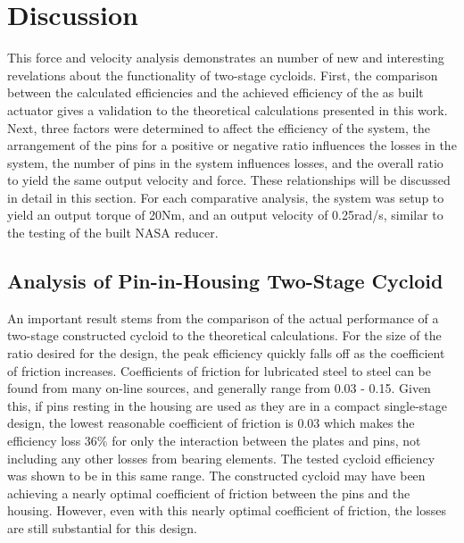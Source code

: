 \section{Discussion} \label{ch:dual:discussion}

This force and velocity analysis demonstrates an number of new and interesting revelations about the functionality of two-stage cycloids. First, the comparison between the calculated efficiencies and the achieved efficiency of the as built actuator gives a validation to the theoretical calculations presented in this work. Next, three factors were determined to affect the efficiency of the system, the arrangement of the pins for a positive or negative ratio influences the losses in the system, the number of pins in the system influences losses, and the overall ratio to yield the same output velocity and force. These relationships will be discussed in detail in this section. For each comparative analysis, the system was setup to yield an output torque of 20Nm, and an output velocity of 0.25rad/s, similar to the testing of the built NASA reducer.

\subsection{Analysis of Pin-in-Housing Two-Stage Cycloid} \label{ch:dual:discussion:actual}

An important result stems from the comparison of the actual performance of a two-stage constructed cycloid to the theoretical calculations. For the size of the ratio desired for the design, the peak efficiency quickly falls off as the coefficient of friction increases. Coefficients of friction for lubricated steel to steel can be found from many on-line sources, and generally range from 0.03 - 0.15. Given this, if pins resting in the housing are used as they are in a compact single-stage design, the lowest reasonable coefficient of friction is 0.03 which makes the efficiency loss 36\% for only the interaction between the plates and pins, not including any other losses from bearing elements. The tested cycloid efficiency was shown to be in this same range. The constructed cycloid may have been achieving a nearly optimal coefficient of friction between the pins and the housing. However, even with this nearly optimal coefficient of friction, the losses are still substantial for this design. 

